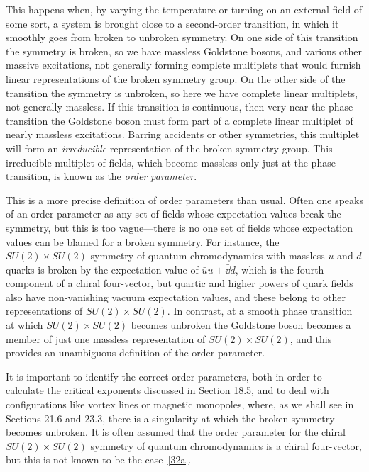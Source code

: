This happens when, by varying the temperature or turning on an external field of some sort, a system is brought close to a second-order transition, in which it smoothly goes from broken to unbroken symmetry. On one side of this transition the symmetry is broken, so we have massless Goldstone bosons, and various other massive excitations, not generally forming complete multiplets that would furnish linear representations of the broken symmetry group. On the other side of the transition the symmetry is unbroken, so here we have complete linear multiplets, not generally massless. If this transition is continuous, then very near the phase transition the Goldstone boson must form part of a complete linear multiplet of nearly massless excitations. Barring accidents or other symmetries, this multiplet will form an \emph{irreducible} representation of the broken symmetry group. This irreducible multiplet of fields, which become massless only just at the phase transition, is known as the \emph{order parameter}.

This is a more precise definition of order parameters than usual. Often one speaks of an order parameter as any set of fields whose expectation values break the symmetry, but this is too vague---there is no one set of fields whose expectation values can be blamed for a broken symmetry. For instance, the $SU(2)\times SU(2)$ symmetry of quantum chromodynamics with massless $u$ and $d$ quarks is broken by the expectation value of $\bar uu+\bar \dd d$, which is the fourth component of a chiral four-vector, but quartic and higher powers of quark fields also have non-vanishing vacuum expectation values, and these belong to other representations of $SU(2)\times SU(2)$. In contrast, at a smooth phase transition at which $SU(2)\times SU(2)$ becomes unbroken the Goldstone boson becomes a member of just one massless representation of $SU(2)\times SU(2)$, and this provides an unambiguous definition of the order parameter.

It is important to identify the correct order parameters, both in order to calculate the critical exponents discussed in Section 18.5, and to deal with configurations like vortex lines or magnetic monopoles, where, as we shall see in Sections 21.6 and 23.3, there is a singularity at which the broken symmetry becomes unbroken. It is often assumed that the order parameter for the chiral $SU(2)\times SU(2)$ symmetry of quantum chromodynamics is a chiral four-vector, but this is not known to be the case~\hyperref[ch19-ref-32a]{[32a]}.
